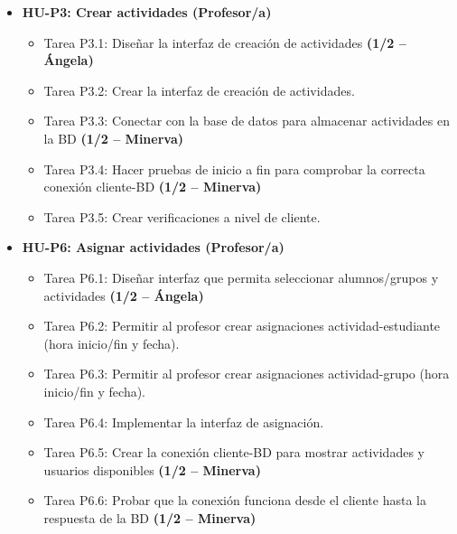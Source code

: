 \begin{itemize}[leftmargin=1.2em, itemsep=4pt]
    \item \textbf{HU-P3: Crear actividades (Profesor/a)}
    \begin{itemize}[label=$\circ$, leftmargin=1.5em, itemsep=2pt]
        \item \textsf{Tarea P3.1:} Diseñar la interfaz de creación de actividades \hfill \textbf{(1/2 -- Ángela)}
        \item \textsf{Tarea P3.2:} Crear la interfaz de creación de actividades.
        \item \textsf{Tarea P3.3:} Conectar con la base de datos para almacenar actividades en la BD \hfill \textbf{(1/2 -- Minerva)}
        \item \textsf{Tarea P3.4:} Hacer pruebas de inicio a fin para comprobar la correcta conexión cliente-BD \hfill \textbf{(1/2 -- Minerva)}
        \item \textsf{Tarea P3.5:} Crear verificaciones a nivel de cliente.
    \end{itemize}

    \item \textbf{HU-P6: Asignar actividades (Profesor/a)}
    \begin{itemize}[label=$\circ$, leftmargin=1.5em, itemsep=2pt]
        \item \textsf{Tarea P6.1:} Diseñar interfaz que permita seleccionar alumnos/grupos y actividades \hfill \textbf{(1/2 -- Ángela)}
        \item \textsf{Tarea P6.2:} Permitir al profesor crear asignaciones actividad-estudiante (hora inicio/fin y fecha).
        \item \textsf{Tarea P6.3:} Permitir al profesor crear asignaciones actividad-grupo (hora inicio/fin y fecha).
        \item \textsf{Tarea P6.4:} Implementar la interfaz de asignación.
        \item \textsf{Tarea P6.5:} Crear la conexión cliente-BD para mostrar actividades y usuarios disponibles \hfill \textbf{(1/2 -- Minerva)}
        \item \textsf{Tarea P6.6:} Probar que la conexión funciona desde el cliente hasta la respuesta de la BD \hfill \textbf{(1/2 -- Minerva)}
    \end{itemize}


\end{itemize}
